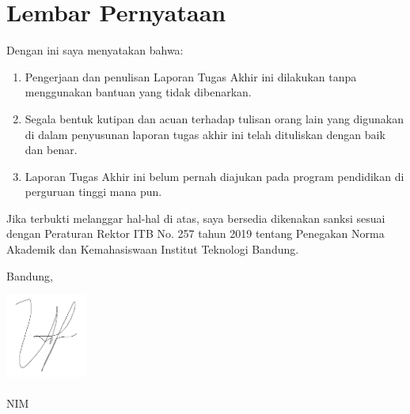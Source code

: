 \chapter*{Lembar Pernyataan}

Dengan ini saya menyatakan bahwa:

\begin{enumerate}

	\item Pengerjaan dan penulisan Laporan Tugas Akhir ini dilakukan tanpa menggunakan bantuan yang tidak dibenarkan.
	\item Segala bentuk kutipan dan acuan terhadap tulisan orang lain yang digunakan di dalam penyusunan laporan tugas akhir ini telah dituliskan dengan baik dan benar.
	\item Laporan Tugas Akhir ini belum pernah diajukan pada program pendidikan di perguruan tinggi mana pun.

\end{enumerate}

Jika terbukti melanggar hal-hal di atas, saya bersedia dikenakan sanksi sesuai dengan Peraturan Rektor ITB No. 257 tahun 2019 tentang Penegakan Norma Akademik dan Kemahasiswaan Institut Teknologi Bandung.
\vspace{15mm}

Bandung, \tanggalpengesahan

\includegraphics[width=0.2\textwidth]{images/sign.png} \\
\namapenulis \\
NIM \nimpenulis
